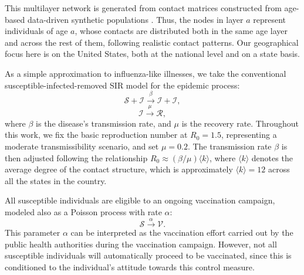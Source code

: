 \documentclass[
 reprint,
 amsmath,amssymb,
 aps,
]{revtex4-2}
\begin{document}
This multilayer network is generated from contact matrices constructed from age-based data-driven synthetic populations \cite{mistry2021inferring, aleta2020data}. Thus, the nodes in layer $a$ represent individuals of age $a$, whose contacts are distributed both in the same age layer and across the rest of them, following realistic contact patterns. Our geographical focus here is on the United States, both at the national level and on a state basis.

As a simple approximation to influenza-like illnesses, we take the conventional susceptible-infected-removed SIR model for the epidemic process:
\begin{equation}
\mathcal{S}+\mathcal{I}\xrightarrow{\beta}\mathcal{I}+\mathcal{I},
\end{equation}
\begin{equation}
\mathcal{I}\xrightarrow{\mu}\mathcal{R},
\end{equation}
where $\beta$ is the disease's transmission rate, and $\mu$ is the recovery rate. Throughout this work, we fix the basic reproduction number at $R_0=1.5$, representing a moderate transmissibility scenario, and set $\mu=0.2$. The transmission rate $\beta$ is then adjusted following the relationship $R_0 \approx (\beta/\mu)\langle k\rangle$, where $\langle k\rangle$ denotes the average degree of the contact structure, which is approximately $\langle k\rangle = 12$ across all the states in the country.

All susceptible individuals are eligible to an ongoing vaccination campaign, modeled also as a Poisson process with rate $\alpha$:
\begin{equation}
\mathcal{S}\xrightarrow{\alpha}\mathcal{V}.
\end{equation}
This parameter $\alpha$ can be interpreted as the vaccination effort carried out by the public health authorities during the vaccination campaign.
However, not all susceptible individuals will automatically proceed to be vaccinated, since this is conditioned to the individual's attitude towards this control measure.
\end{document}
